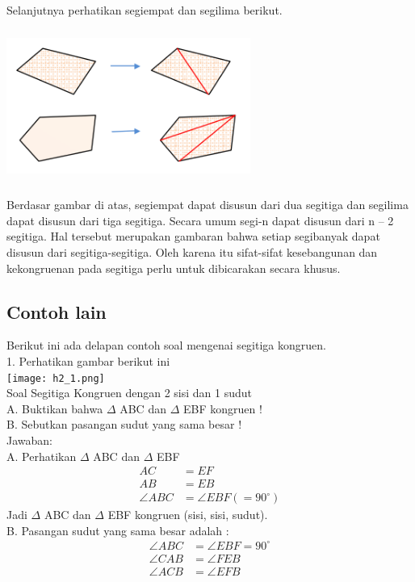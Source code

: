 \documentclass[11pt,fleqn]{book} %
\begin{document}
Selanjutnya perhatikan segiempat dan segilima berikut. 

\includegraphics[width = 8cm, height= 5cm]{Pictures/3.png}

Berdasar gambar di atas, segiempat dapat disusun dari dua segitiga dan segilima
dapat disusun dari tiga segitiga. Secara umum segi-n dapat disusun dari n – 2 segitiga.
Hal tersebut merupakan gambaran bahwa setiap segibanyak dapat disusun dari segitiga-segitiga. Oleh karena itu sifat-sifat kesebangunan dan kekongruenan pada
segitiga perlu untuk dibicarakan secara khusus. 

\subsection{Contoh lain}

Berikut ini ada delapan contoh soal mengenai segitiga kongruen.\\

1. Perhatikan gambar berikut ini\\
\texttt{[image: h2\_1.png]}\\
Soal Segitiga Kongruen dengan 2 sisi dan 1 sudut\\
A. Buktikan bahwa $\Delta$ ABC dan $\Delta$ EBF kongruen !\\
B. Sebutkan pasangan sudut yang sama besar !\\

Jawaban:\\
A. Perhatikan $\Delta$ ABC dan $\Delta$ EBF\\
    \begin{align*} AC &= EF \\ AB &= EB \\ \angle ABC &= \angle EBF (=90^{\circ}) \end{align*}
Jadi $\Delta$ ABC dan $\Delta$ EBF kongruen (sisi, sisi, sudut).\\

B. Pasangan sudut yang sama besar adalah :
    \begin{align*} \angle ABC &= \angle EBF = 90^{\circ} \\ \angle CAB &= \angle FEB \\ \angle ACB &= \angle EFB \end{align*}
\end{document}
